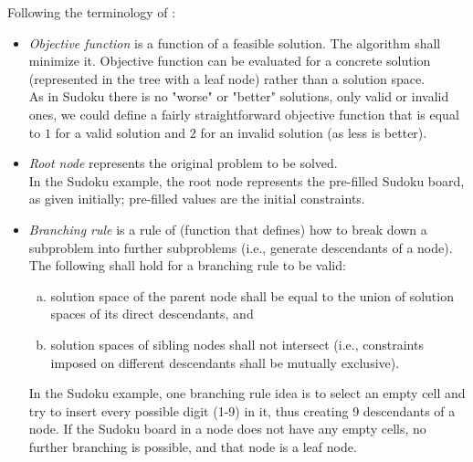 Following the terminology of \cite{clausen1999principles}:

\begin{itemize}
    \item \emph{Objective function} is a function of a feasible solution. The algorithm shall
        minimize it.
        Objective function can be evaluated for a concrete solution
        (represented in the tree with a leaf node) rather than a solution space. \\
        As in Sudoku there is no "worse" or "better" solutions, only valid or invalid ones,
        we could define a fairly straightforward objective function that is equal to
        $1$ for a valid solution and $2$ for an invalid solution (as less is better).

    \item \emph{Root node} represents the original problem to be solved. \\
        In the Sudoku example,
        the root node represents the pre-filled Sudoku board, as given initially;
        pre-filled values are the initial constraints.

    \item \emph{Branching rule} is a rule of (function that defines) how to break down a subproblem
        into further subproblems (i.e., generate descendants of a node). \\
        The following shall hold for a branching rule to be valid:
        \begin{enumerate}[(a)]
        \item solution space of the parent node shall be equal to the union of solution spaces of its
            direct descendants, and
        \item solution spaces of sibling nodes shall not intersect (i.e.,
            constraints imposed on different descendants shall be mutually exclusive).
        \end{enumerate}

        In the Sudoku example, one branching rule idea is to select an empty cell
        and try to insert every possible digit (1-9) in it, thus creating 9 descendants of a node.
        If the Sudoku board in a node does not have any empty cells, no further branching is possible,
        and that node is a leaf node.


\end{itemize}
